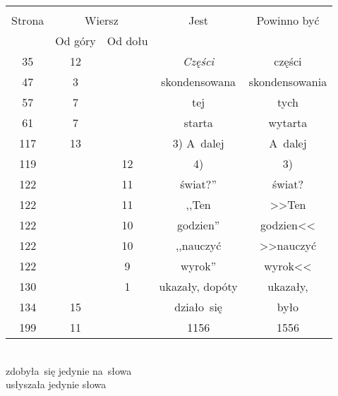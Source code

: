 \documentclass[a4paper,11pt]{article}
\begin{document}
\begin{center}
  \begin{tabular}{|c|c|c|c|c|}
    \hline
    & \multicolumn{2}{c|}{} & & \\
    Strona & \multicolumn{2}{c|}{Wiersz} & Jest
                              & Powinno być \\ \cline{2-3}
    & Od góry & Od dołu & & \\
    \hline
    35  & 12 & & \emph{Części} & części \\
    47  &  3 & & skondensowana & skondensowania \\
    57  &  7 & & tej & tych \\
    61  &  7 & & starta & wytarta \\
    117 & 13 & & 3) A~dalej & A~dalej \\
    119 & & 12 & 4) & 3) \\
    122 & & 11 & świat?'' & świat? \\
    122 & & 11 & ,,Ten  %
           & >>Ten \\
    122 & & 10 & godzien'' & godzien<<  %
    \\
    122 & & 10 & ,,nauczyć  %
           & >>nauczyć \\
    122 & &  9 & wyrok''
           & wyrok<<  %
    \\
    130 & &  1 & ukazały, dopóty & ukazały, \\
    134 & 15 & & działo~się & było \\
    199 & 11 & & 1156 & 1556 \\
    \hline
  \end{tabular}
\end{center}
\noi
{} \\
\Jest zdobyła~się jedynie na~słowa \\
\Pow  usłyszała jedynie słowa \\
\end{document}
